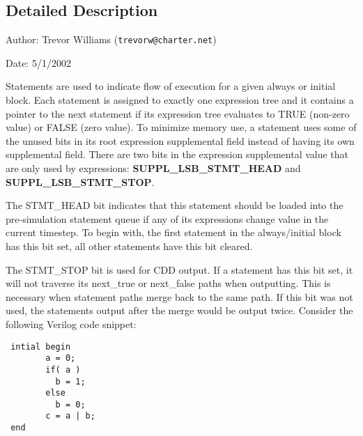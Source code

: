 \subsection{Detailed Description}
\begin{Desc}
\item[Author:]Trevor Williams ({\tt trevorw@charter.net}) \end{Desc}
\begin{Desc}
\item[Date:]5/1/2002\end{Desc}
\begin{Desc}
\item[]Statements are used to indicate flow of execution for a given always or initial block. Each statement is assigned to exactly one expression tree and it contains a pointer to the next statement if its expression tree evaluates to TRUE (non-zero value) or FALSE (zero value). To minimize memory use, a statement uses some of the unused bits in its root expression supplemental field instead of having its own supplemental field. There are two bits in the expression supplemental value that are only used by expressions: {\bf SUPPL\_\-LSB\_\-STMT\_\-HEAD} and {\bf SUPPL\_\-LSB\_\-STMT\_\-STOP}.\end{Desc}
\begin{Desc}
\item[]The STMT\_\-HEAD bit indicates that this statement should be loaded into the pre-simulation statement queue if any of its expressions change value in the current timestep. To begin with, the first statement in the always/initial block has this bit set, all other statements have this bit cleared.\end{Desc}
\begin{Desc}
\item[]The STMT\_\-STOP bit is used for CDD output. If a statement has this bit set, it will not traverse its next\_\-true or next\_\-false paths when outputting. This is necessary when statement paths merge back to the same path. If this bit was not used, the statements output after the merge would be output twice. Consider the following Verilog code snippet:\end{Desc}


\footnotesize\begin{verbatim}
 intial begin
        a = 0;
        if( a )
          b = 1;
        else
          b = 0;
        c = a | b;
 end
 
\end{verbatim}\normalsize


